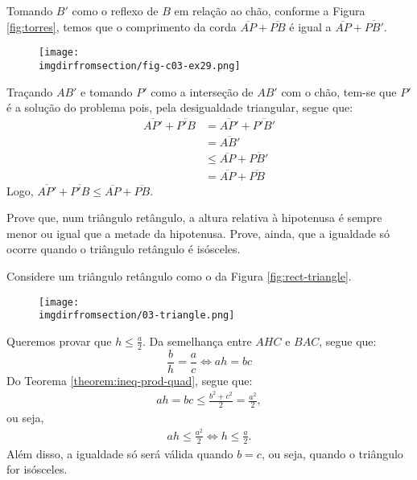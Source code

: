 \begin{solution}
Tomando $B'$ como o reflexo de $B$ em relação ao chão, conforme a Figura \ref{fig:torres}, temos que o comprimento da corda $\overline{AP} + \overline{PB}$ é igual a $\overline{AP} + \overline{PB'}$. 

\label{fig:torres}
\begin{figure}[H]
\texttt{[image: \\imgdirfromsection/fig-c03-ex29.png]}
\centering
\end{figure}

Traçando $AB'$ e tomando $P'$ como a interseção de $AB'$ com o chão, tem-se que $P'$ é a solução do problema pois, pela desigualdade triangular, segue que:
%
\begin{align*}
\overline{AP'} +\overline{P'B} & = \overline{AP'} +\overline{P'B'} \\
& = \overline{AB'} \\
& \le \overline{AP} +\overline{PB'} \\
& = \overline{AP} +\overline{PB} 
\end{align*}
%
Logo, $\overline{AP'} +\overline{P'B} \le \overline{AP} +\overline{PB}$.
\end{solution}

\begin{example}
Prove que, num triângulo retângulo, a altura relativa à hipotenusa é sempre menor ou igual que a metade da hipotenusa. Prove, ainda, que
a igualdade só ocorre quando o triângulo retângulo é isósceles.
\end{example}

\begin{solution}
Considere um triângulo retângulo como o da Figura \ref{fig:rect-triangle}.
%
\label{fig:rect-triangle}
\begin{figure}[H]
\texttt{[image: \\imgdirfromsection/03-triangle.png]}
\centering
\end{figure}
%
Queremos provar que $h \le \frac a 2$. Da semelhança entre $AHC$ e $BAC$, segue que:
%
\begin{equation*} 
\frac b h = \frac a c \iff ah = bc
\end{equation*} 
%
Do Teorema \ref{theorem:ineq-prod-quad}, segue que:
%
\begin{align*}
ah = bc \le \frac {b^2 + c^2} 2 = \frac {a^2} 2,
\end{align*}
%
ou seja, 
%
\begin{align*}
ah \le \frac {a^2} 2 \iff h \le \frac a 2.
\end{align*}
%
Além disso, a igualdade só será válida quando $b=c$, ou seja, quando o triângulo for isósceles.
\end{solution}

